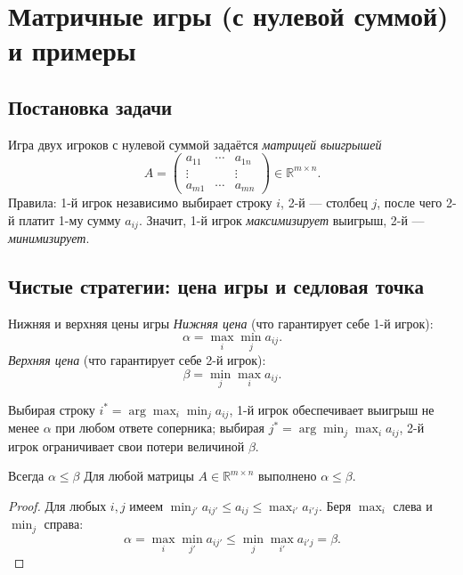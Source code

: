 
\section{Матричные игры (с нулевой суммой) и примеры}

\subsection{Постановка задачи}

Игра двух игроков с нулевой суммой задаётся \emph{матрицей выигрышей}
\[
A=\begin{pmatrix} a_{11} & \cdots & a_{1n} \\ \vdots & & \vdots \\ a_{m1} & \cdots & a_{mn}\end{pmatrix}\in\mathbb{R}^{m\times n}.
\]
Правила: 1-й игрок независимо выбирает строку $i$, 2-й — столбец $j$, после чего 2-й платит 1-му сумму $a_{ij}$. Значит, 1-й игрок \emph{максимизирует} выигрыш, 2-й — \emph{минимизирует}.

\subsection{Чистые стратегии: цена игры и седловая точка}

\begin{Definition}{Нижняя и верхняя цены игры}{}
	\emph{Нижняя цена} (что гарантирует себе 1-й игрок):
	\[
	\alpha=\max_i\min_j a_{ij}.
	\]
	\emph{Верхняя цена} (что гарантирует себе 2-й игрок):
	\[
	\beta=\min_j\max_i a_{ij}.
	\]
\end{Definition}

Выбирая строку $i^*=\arg\max_i\min_j a_{ij}$, 1-й игрок обеспечивает выигрыш не менее $\alpha$ при любом ответе соперника; выбирая $j^*=\arg\min_j\max_i a_{ij}$, 2-й игрок ограничивает свои потери величиной $\beta$.

\begin{Theorem}{Всегда $\alpha\le\beta$}{}
	Для любой матрицы $A\in\mathbb{R}^{m\times n}$ выполнено $\alpha\le\beta$.
\end{Theorem}

\begin{proof}
	Для любых $i,j$ имеем $\min_{j'}a_{ij'}\le a_{ij}\le\max_{i'}a_{i'j}$. Беря $\max_i$ слева и $\min_j$ справа:
	\[
	\alpha=\max_i\min_{j'}a_{ij'}\le\min_j\max_{i'}a_{i'j}=\beta.
	\]
\end{proof}

